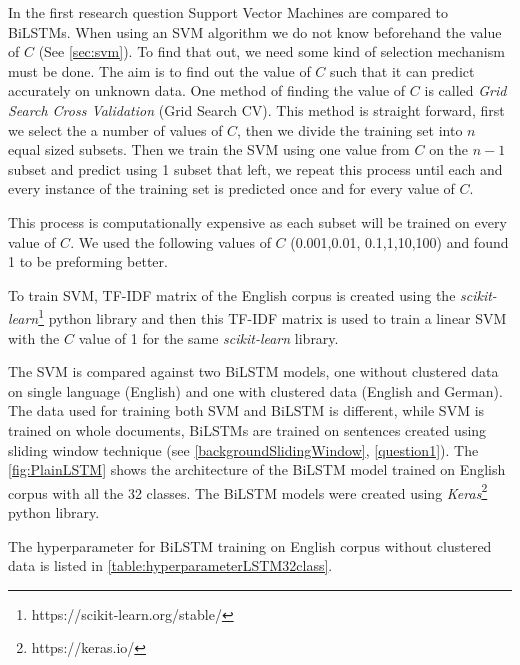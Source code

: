 In the first research question Support Vector Machines are compared to \glspl{BiLSTM}. When using an \gls{SVM} algorithm we do not know beforehand the value of $C$ (See \ref{sec:svm}). To find that out, we need some kind of selection mechanism must be done. The aim is to find out the value of $C$ such that it can predict accurately on unknown data. One method of finding the value of $C$ is called \textit{Grid Search Cross Validation} (Grid Search CV). This method is straight forward, first we select the a number of values of $C$, then we divide the training set into $n$ equal sized subsets. Then we train the \gls{SVM} using one value from $C$ on the $n-1$ subset and predict using 1 subset that left, we repeat this process until each and every instance of the training set is predicted once and for every value of $C$.

This process is computationally expensive as each subset will be trained on every value of $C$. We used the following values of $C$ (0.001,0.01, 0.1,1,10,100) and found 1 to be preforming better.

To train \gls{SVM}, \gls{TF-IDF} matrix of the English corpus is created using the \textit{scikit-learn}\footnote{https://scikit-learn.org/stable/} python library and then this \gls{TF-IDF} matrix is used to train a linear \gls{SVM} with the $C$ value of 1 for the same \textit{scikit-learn} library. 

The \gls{SVM} is compared against two \gls{BiLSTM} models, one without clustered data on single language (English) and one with clustered data (English and German). The data used for training both \gls{SVM} and \gls{BiLSTM} is different, while \gls{SVM} is trained on whole documents, \glspl{BiLSTM} are trained on sentences created using sliding window technique (see \ref{backgroundSlidingWindow}, \ref{question1}). The \ref{fig:PlainLSTM} shows the architecture of the \gls{BiLSTM} model trained on English corpus with all the 32 classes. The \gls{BiLSTM} models were created using \textit{Keras}\footnote{https://keras.io/} python library. 

The hyperparameter for \gls{BiLSTM} training on English corpus without clustered data is listed in \ref{table:hyperparameterLSTM32class}. 

